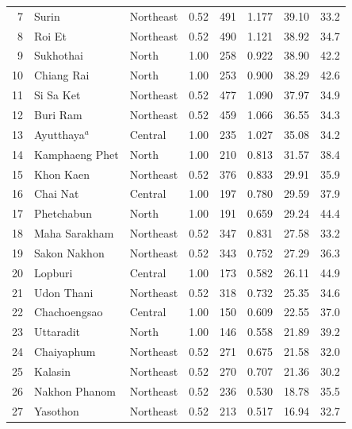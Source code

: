 \documentclass[fleqn,10pt]{olplainarticle}
\begin{document}
\begin{longtable}{@{}rllcrrrr@{}}
 7 & Surin              & Northeast & 0.52          & 491 & 1.177 & 39.10 & 33.2 \\
 8 & Roi Et             & Northeast & 0.52          & 490 & 1.121 & 38.92 & 34.7 \\
 9 & Sukhothai          & North     & 1.00          & 258 & 0.922 & 38.90 & 42.2 \\
10 & Chiang Rai         & North     & 1.00          & 253 & 0.900 & 38.29 & 42.6 \\
11 & Si Sa Ket          & Northeast & 0.52          & 477 & 1.090 & 37.97 & 34.9 \\
12 & Buri Ram           & Northeast & 0.52          & 459 & 1.066 & 36.55 & 34.3 \\
13 & Ayutthaya$^a$      & Central   & 1.00          & 235 & 1.027 & 35.08 & 34.2 \\
14 & Kamphaeng Phet     & North     & 1.00          & 210 & 0.813 & 31.57 & 38.4 \\
15 & Khon Kaen          & Northeast & 0.52          & 376 & 0.833 & 29.91 & 35.9 \\
16 & Chai Nat           & Central   & 1.00          & 197 & 0.780 & 29.59 & 37.9 \\
17 & Phetchabun         & North     & 1.00          & 191 & 0.659 & 29.24 & 44.4 \\
18 & Maha Sarakham      & Northeast & 0.52          & 347 & 0.831 & 27.58 & 33.2 \\
19 & Sakon Nakhon       & Northeast & 0.52          & 343 & 0.752 & 27.29 & 36.3 \\
20 & Lopburi            & Central   & 1.00          & 173 & 0.582 & 26.11 & 44.9 \\
21 & Udon Thani         & Northeast & 0.52          & 318 & 0.732 & 25.35 & 34.6 \\
22 & Chachoengsao       & Central   & 1.00          & 150 & 0.609 & 22.55 & 37.0 \\
23 & Uttaradit          & North     & 1.00          & 146 & 0.558 & 21.89 & 39.2 \\
24 & Chaiyaphum         & Northeast & 0.52          & 271 & 0.675 & 21.58 & 32.0 \\
25 & Kalasin            & Northeast & 0.52          & 270 & 0.707 & 21.36 & 30.2 \\
26 & Nakhon Phanom      & Northeast & 0.52          & 236 & 0.530 & 18.78 & 35.5 \\
27 & Yasothon           & Northeast & 0.52          & 213 & 0.517 & 16.94 & 32.7 \\

\end{longtable}
\end{document}
